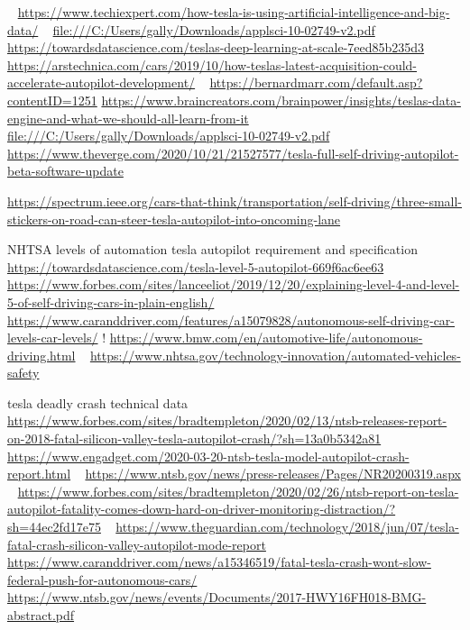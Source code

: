 \documentclass{article}
\begin{document}
~\cite{techiebigdata}
\url{https://www.techiexpert.com/how-tesla-is-using-artificial-intelligence-and-big-data/}
~\cite{teslaapplsci}
\url{file:///C:/Users/gally/Downloads/applsci-10-02749-v2.pdf}
~\cite{tesladeep}
\url{https://towardsdatascience.com/teslas-deep-learning-at-scale-7eed85b235d3}
~\cite{tesla_acc}
\url{https://arstechnica.com/cars/2019/10/how-teslas-latest-acquisition-could-accelerate-autopilot-development/}
~\cite{bernardmarr}
\url{https://bernardmarr.com/default.asp?contentID=1251}
\cite{dataenginetesla}
\url{https://www.braincreators.com/brainpower/insights/teslas-data-engine-and-what-we-should-all-learn-from-it}
~\cite{teslaapplsci}
\url{file:///C:/Users/gally/Downloads/applsci-10-02749-v2.pdf}
~\cite{thevergetesla}
\url{https://www.theverge.com/2020/10/21/21527577/tesla-full-self-driving-autopilot-beta-software-update}




\url{https://spectrum.ieee.org/cars-that-think/transportation/self-driving/three-small-stickers-on-road-can-steer-tesla-autopilot-into-oncoming-lane}

NHTSA levels of automation
tesla autopilot requirement and specification
~\cite{teslalev5}
\url{https://towardsdatascience.com/tesla-level-5-autopilot-669f6ac6ee63}
~\cite{lev4lev5}
\url{https://www.forbes.com/sites/lanceeliot/2019/12/20/explaining-level-4-and-level-5-of-self-driving-cars-in-plain-english/}
~\cite{carlevels}
\url{https://www.caranddriver.com/features/a15079828/autonomous-self-driving-car-levels-car-levels/}
!\cite{autodrive}
\url{https://www.bmw.com/en/automotive-life/autonomous-driving.html}
~\cite{avsnhtsa}
\url{https://www.nhtsa.gov/technology-innovation/automated-vehicles-safety}




tesla deadly crash technical data
~\cite{ntsbreportfatal}
\url{https://www.forbes.com/sites/bradtempleton/2020/02/13/ntsb-releases-report-on-2018-fatal-silicon-valley-tesla-autopilot-crash/?sh=13a0b5342a81}
~\cite{engadgetteslareport}
\url{https://www.engadget.com/2020-03-20-ntsb-tesla-model-autopilot-crash-report.html}
~\cite{ntsbpress}
\url{https://www.ntsb.gov/news/press-releases/Pages/NR20200319.aspx}
~\cite{testpilotmonitor}
\url{https://www.forbes.com/sites/bradtempleton/2020/02/26/ntsb-report-on-tesla-autopilot-fatality-comes-down-hard-on-driver-monitoring-distraction/?sh=44ec2fd17e75}
~\cite{teslasilval}
\url{https://www.theguardian.com/technology/2018/jun/07/tesla-fatal-crash-silicon-valley-autopilot-mode-report}
~\cite{teslafedpush}
\url{https://www.caranddriver.com/news/a15346519/fatal-tesla-crash-wont-slow-federal-push-for-autonomous-cars/}
~\cite{ntsbabstract}
\url{https://www.ntsb.gov/news/events/Documents/2017-HWY16FH018-BMG-abstract.pdf}
\end{document}
